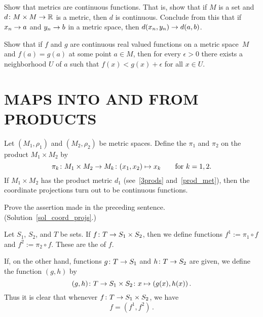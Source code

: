 \begin{prob} Show that metrics are continuous functions. That is, show that if $M$ is a set and
$d\colon M \times M \rightarrow \mathbb{R}$ is a metric, then $d$ is continuous. Conclude from this that if $x_n
\rightarrow a$ and $y_n \rightarrow b$ in a metric space, then $d(x_n,y_n) \rightarrow d(a,b)$.
\end{prob}

\begin{prob} Show that if $f$ and $g$ are continuous real valued functions on a metric space~$M$
and $f(a) = g(a)$ at some point $a \in M$, then for every $\epsilon > 0$ there exists a
neighborhood $U$ of $a$ such that $f(x) < g(x) + \epsilon$ for all $x \in U$.
\end{prob}







\section{MAPS INTO AND FROM PRODUCTS}
Let $(M_1,\rho_1)$ and $(M_2,\rho_2)$ be metric spaces.  Define the
 $\pi_1$ and $\pi_2$ on the product $M_1\times M_2$ by
  \[\pi_k\colon M_1 \times M_2 \rightarrow M_k\colon (x_1,x_2) \mapsto x_k
                     \qquad\text{for $k=1,2$.}\]
If $M_1 \times M_2$ has the product metric $d_1$ (see~\ref{3prods} and~\ref{prod_met}),
then the coordinate projections turn out to be continuous functions.

\begin{exer}\label{coord_projs} Prove the assertion made in the preceding sentence.
(Solution~\ref{sol_coord_projs}.)
\end{exer}

\begin{notn} Let $S_1$, $S_2$, and $T$ be sets.  If $f\colon  T \rightarrow S_1 \times S_2$, then we
define functions
$f^1 := \pi_1 \circ f$ and $f^2 := \pi_2 \circ f$.  These are the
 of $f$.

If, on the other hand, functions $g\colon T \rightarrow S_1$ and $h\colon T \rightarrow S_2$ are given, we define
the function $(g,h)$ by
  \[(g,h)\colon T \rightarrow S_1 \times S_2\colon x \mapsto (g(x),h(x))\,.\]
Thus it is clear that whenever $f\colon T \rightarrow S_1 \times S_2$, we have
  \[f = (f^1,f^2)\,.\]
\end{notn}

